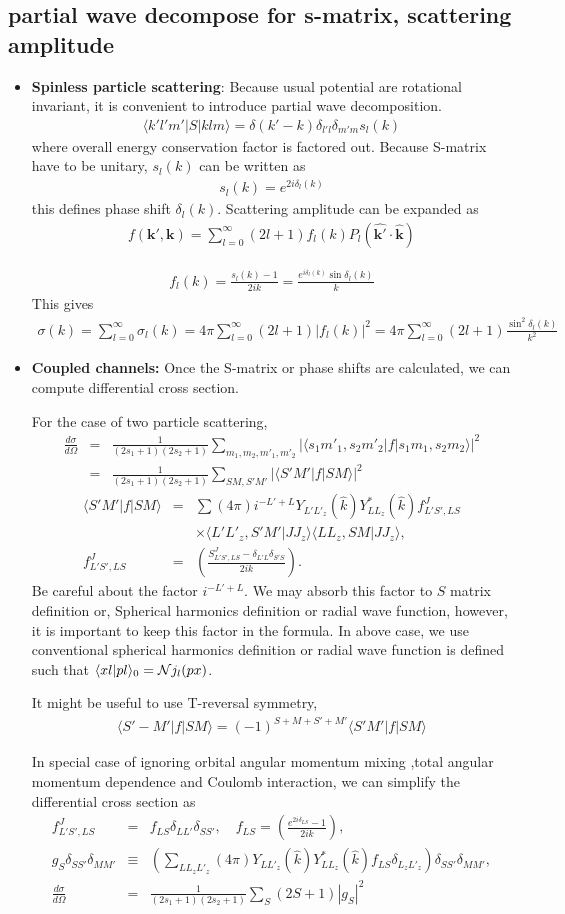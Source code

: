 \documentclass[10pt]{book}
\def\bm{\boldsymbol}
\newcommand{\bea}{\begin{eqnarray}}
\newcommand{\eea}{\end{eqnarray}}
\newcommand{\no}{\nonumber \\}
\def\vk{{\bm k}}
\def\la{\langle}
\def\ra{\rangle}
\begin{document}
\subsection{partial wave decompose for s-matrix, scattering amplitude}
\begin{itemize}

\item {\bf Spinless particle scattering}:
Because usual potential are rotational invariant, it is convenient to introduce partial wave
decomposition.
\bea
\la k' l' m'|S|klm\ra=\delta(k'-k)\delta_{l'l}\delta_{m'm}s_l(k)
\eea
where overall energy conservation factor is factored out. Because S-matrix have to be unitary,
$s_l(k)$ can be written as
\bea
s_l(k)=e^{2i\delta_l(k)}
\eea
this defines phase shift $\delta_l(k)$. Scattering amplitude can be expanded as
\bea
f(\vk',\vk)=\sum_{l=0}^\infty (2l+1) f_l(k)P_l(\hat{\vk'}\cdot\hat{\vk})
\eea

\bea
f_l(k)=\frac{s_l(k)-1}{2ik}=\frac{e^{i\delta_l(k)}\sin\delta_l(k)}{k}
\eea
This gives
\bea
\sigma(k)=\sum_{l=0}^\infty \sigma_l(k)=4\pi\sum_{l=0}^\infty (2l+1)|f_l(k)|^2
         =4\pi\sum_{l=0}^\infty (2l+1)\frac{\sin^2\delta_l(k)}{k^2}
\eea

\item {\bf Coupled channels:}
Once the S-matrix or phase shifts are calculated, we can compute
differential cross section.

For the case of two particle scattering,
\bea
\frac{d\sigma}{d\Omega}
&=&\frac{1}{(2s_1+1)(2s_2+1)}\sum_{m_1,m_2,m'_1,m'_2}
 |\la s_1 m'_1, s_2 m'_2|f|s_1 m_1,s_2 m_2\ra|^2\no 
&=&\frac{1}{(2s_1+1)(2s_2+1)}\sum_{S M, S' M'}
 |\la S' M'|f|S M\ra|^2 
\eea
\bea
\la S' M'|f|S M\ra
&=&\sum (4\pi)i^{-L'+L} Y_{L' L'_z}(\hat{k}) Y^*_{L L_z}(\hat{k})
        f^{J}_{L' S',LS}\no
        & &\times \la L' L'_z, S' M'| J J_z\ra
        \la L L_z, S M| J J_z\ra,\no
f^{J}_{L' S',LS}&=&
        \left(\frac{S^J_{L' S',LS}-\delta_{L'L}\delta_{S'S}}{2i k}\right).
\eea
Be careful about the factor $i^{-L'+L}$. We may absorb this factor 
to $S$ matrix definition or, Spherical harmonics definition or
radial wave function, however,
it is important to 
keep this factor in the formula. 
In above case, we use conventional spherical harmonics definition or
radial wave function is defined such that $\la x l|p l\ra_0={\cal N}j_{l}(px)$.


It might be useful to use T-reversal symmetry,
\bea 
\la S' -M'|f|S M\ra =(-1)^{S+M+S'+M'}\la S' M'|f|S M\ra 
\eea 


In special case of ignoring orbital angular momentum mixing
,total angular momentum dependence and Coulomb interaction, 
we can simplify the differential cross section as 
\bea
f^{J}_{L' S',LS}&=& f_{LS}\delta_{LL'}\delta_{SS'},
\quad f_{LS}=
\left(\frac{e^{2i\delta_{LS}}-1}{2i k}\right),\no
 g_{S}\delta_{SS'}\delta_{MM'}
&\equiv&\left(\sum_{L L_z L'_z} (4\pi)Y_{L L'_z}(\hat{k}) Y^*_{L L_z}(\hat{k})
        f_{L S}\delta_{L_z L'_z}\right)
        \delta_{SS'}\delta_{MM'}
 ,\no
\frac{d\sigma}{d\Omega}
&=& \frac{1}{(2s_1+1)(2s_2+1)}
    \sum_{S}(2S+1) |g_S|^2 
\eea

\end{itemize}
\end{document}
